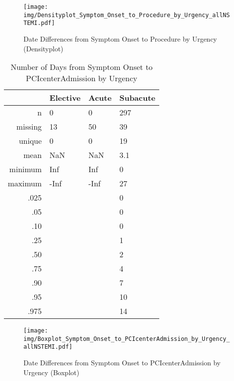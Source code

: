 \documentclass[presentation,xcolor=pdftex,dvipsnames,table,11pt]{beamer}
\begin{document}
\begin{tiny}
\begin{frame}
\begin{figure}
  \centering
  \caption{Date Differences from Symptom Onset to Procedure by Urgency (Densityplot)}
  \label{Density: Date Differences from Symptom Onset to Procedure by Urgency}
\texttt{[image: img/Densityplot\_Symptom\_Onset\_to\_Procedure\_by\_Urgency\_allNSTEMI.pdf]}\end{figure}
\end{frame}




\begin{table}[ht]
\centering
\begin{tabular}{rlll}
  \toprule
 & Elective & Acute & Subacute \\ 
  \midrule
n & 0 & 0 & 297 \\ 
  missing & 13 & 50 & 39 \\ 
  unique & 0 & 0 & 19 \\ 
  mean & NaN & NaN & 3.1 \\ 
  minimum & Inf & Inf & 0 \\ 
  maximum & -Inf & -Inf & 27 \\ 
  .025 &  &  & 0 \\ 
  .05 &  &  & 0 \\ 
  .10 &  &  & 0 \\ 
  .25 &  &  & 1 \\ 
  .50 &  &  & 2 \\ 
  .75 &  &  & 4 \\ 
  .90 &  &  & 7 \\ 
  .95 &  &  & 10 \\ 
  .975 &  &  & 14 \\ 
   \bottomrule
\end{tabular}
\caption{Number of Days from Symptom Onset to PCIcenterAdmission by Urgency} 
\end{table}
\begin{frame}
\begin{figure}
  \centering
  \caption{Date Differences from Symptom Onset to PCIcenterAdmission by Urgency (Boxplot)}
  \label{Boxplot: Date Differences from Symptom Onset to PCIcenterAdmission by Urgency}
\texttt{[image: img/Boxplot\_Symptom\_Onset\_to\_PCIcenterAdmission\_by\_Urgency\_allNSTEMI.pdf]}\end{figure}
\end{frame}



\end{tiny}
\end{document}
